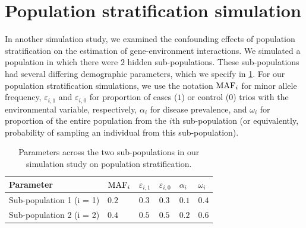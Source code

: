 \section{Population stratification simulation}\label{sec:popstrat}

In another simulation study, we examined the confounding effects of population stratification on the estimation of gene-environment interactions.
We simulated a population in which there were $2$ hidden sub-populations.
These sub-populations had several differing demographic parameters, which we specify in \cref{tab:subpop}.
For our population stratification simulations, we use the notation ${\rm MAF}_{i}$ for minor allele frequency, $\varepsilon_{i, 1}$ and $\varepsilon_{i, 0}$ for proportion of cases ($1$) or control ($0$) trios with the environmental variable, respectively, $\alpha_i$ for disease prevalence, and $\omega_i$ for proportion of the entire population from the $i$th sub-population (or equivalently, probability of sampling an individual from this sub-population).
\begin{table}[t]
\centering
\caption{Parameters across the two sub-populations in our simulation study on population stratification.\label{tab:subpop}}
\begin{tabular}{llllll}
  \hline
  Parameter        & ${\rm MAF}_{i}$   & $\varepsilon_{i, 1}$ & $\varepsilon_{i, 0}$ & $\alpha_i$ & $\omega_i$ \\ \hline
Sub-population 1 (i = 1)  & $0.2$ & $0.3$        & $0.3$        & $0.1$    & $0.4$    \\
Sub-population 2 (i = 2) & $0.4$ & $0.5$        & $0.5$        & $0.2$    & $0.6$    \\ \hline
\end{tabular}
\end{table}

